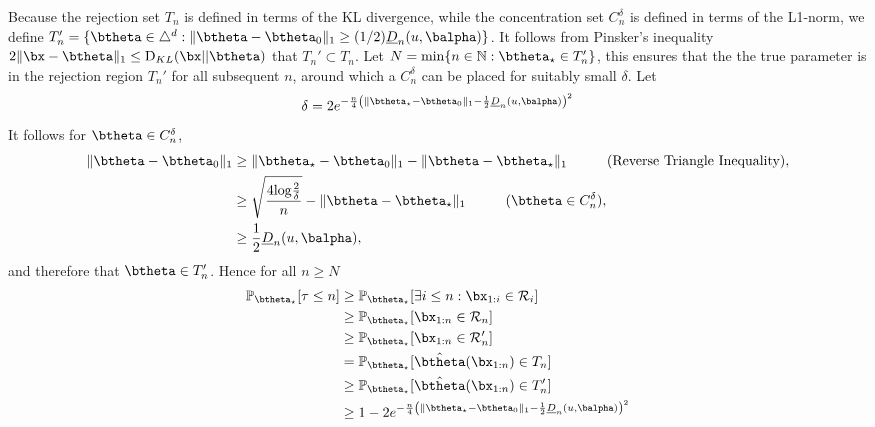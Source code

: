 \documentclass[11pt]{article}
\def\log{{\rm log}}
\newcommand{\KL}{\mathrm{D}_{KL}}
\begin{document}
Because the rejection set $T_n$ is defined in terms of the KL divergence, while the concentration set $C_n^\delta$ is defined in terms of the L1-norm, we define
$T_n' = \{\btheta \in \triangle^d : \|\btheta-\btheta_0\|_1 \geq (1/2)\underline{D}_n(u,\balpha)\}$.
It follows from Pinsker's inequality $2\|\bx-\btheta\|_1\leq \KL(\bx||\btheta)$ that $T_n' \subset T_n$.
Let $N = \min \{n \in \mathbb{N} : \btheta_\star \in T_n'\}$, this ensures that the the true parameter is in the rejection region $T_n'$ for all subsequent $n$, around which a $C_n^\delta$ can be placed for suitably small $\delta$.
Let
\begin{equation*}
  \delta = 2e^{-\frac{n}{4}\left(\|\btheta_\star - \btheta_0\|_1-\frac{1}{2}\underline{D}_n(u,\balpha)\right)^2}
\end{equation*}
It follows for $\btheta \in C_n^\delta$, 
\begin{align*}
  \|\btheta-\btheta_0\|_1 &\geq  \|\btheta_\star - \btheta_0\|_1 - \|\btheta - \btheta_\star \|_1 \hspace{1cm}\text{(Reverse Triangle Inequality)},\\
  &\geq \sqrt{\frac{4\log \frac{2}{\delta}}{n}} - \|\btheta - \btheta_\star \|_1 \hspace{1cm} (\btheta \in C_n^\delta),\\
  &\geq \frac{1}{2}\underline{D}_n(u,\balpha),
\end{align*}
and therefore that $\btheta \in T_n'$. Hence for all $n \geq N$
\begin{align*}
  \mathbb{P}_{\btheta_\star}[\tau \leq n] &\geq \mathbb{P}_{\btheta_\star}[\exists i \leq n : \bx_{1:i} \in \mathcal{R}_i]\\ 
&\geq \mathbb{P}_{\btheta_\star}[\bx_{1:n} \in \mathcal{R}_n]\\ 
&\geq \mathbb{P}_{\btheta_\star}[\bx_{1:n} \in \mathcal{R}'_n]\\ 
&= \mathbb{P}_{\btheta_\star}[\hat{\btheta}(\bx_{1:n}) \in T_n]\\ 
&\geq \mathbb{P}_{\btheta_\star}[\hat{\btheta}(\bx_{1:n}) \in T_n']\\
&\geq 1 -2e^{-\frac{n}{4}\left(\|\btheta_\star - \btheta_0\|_1-\frac{1}{2}\underline{D}_n(u,\balpha)\right)^2} \\
\end{align*}
\end{document}
